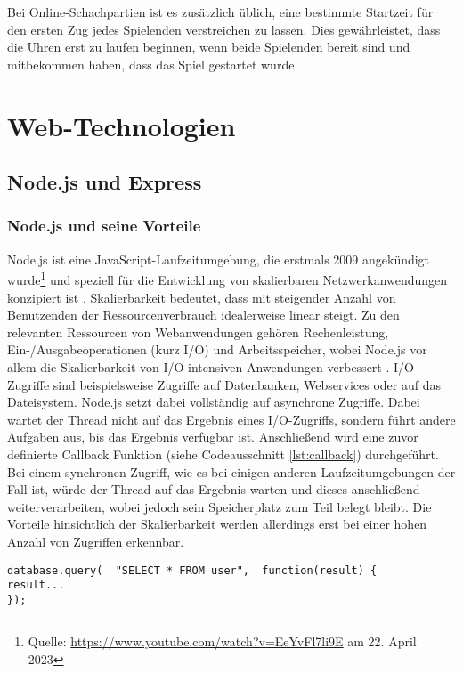 Bei Online-Schachpartien ist es zusätzlich üblich, eine bestimmte Startzeit für den ersten Zug jedes Spielenden verstreichen zu lassen. Dies gewährleistet, dass die Uhren erst zu laufen beginnen, wenn beide Spielenden bereit sind und mitbekommen haben, dass das Spiel gestartet wurde.

    \section{Web-Technologien}
        \subsection{Node.js und Express}
        \subsubsection{Node.js und seine Vorteile}
        \label{sec:node.js}
Node.js ist eine JavaScript-Laufzeitumgebung, die erstmals 2009 angekündigt wurde\footnote{Quelle: \url{https://www.youtube.com/watch?v=EeYvFl7li9E} am 22. April 2023} und speziell für die Entwicklung von skalierbaren Netzwerkanwendungen konzipiert ist \cite[Kapitel~5]{nodejs}. Skalierbarkeit bedeutet, dass mit steigender Anzahl von Benutzenden der Ressourcenverbrauch idealerweise linear steigt. Zu den relevanten Ressourcen von Webanwendungen gehören Rechenleistung, Ein-/Ausgabeoperationen (kurz I/O) und Arbeitsspeicher, wobei Node.js vor allem die Skalierbarkeit von I/O intensiven Anwendungen verbessert \cite{nodejsbook}.
I/O-Zugriffe sind beispielsweise Zugriffe auf Datenbanken, Webservices oder auf das Dateisystem. Node.js setzt dabei vollständig auf asynchrone Zugriffe. Dabei wartet der Thread nicht auf das Ergebnis eines I/O-Zugriffs, sondern führt andere Aufgaben aus, bis das Ergebnis verfügbar ist. Anschließend wird eine zuvor definierte Callback Funktion (siehe Codeausschnitt \ref{lst:callback}) durchgeführt. Bei einem synchronen Zugriff, wie es bei einigen anderen Laufzeitumgebungen der Fall ist, würde der Thread auf das Ergebnis warten und dieses anschließend weiterverarbeiten, wobei jedoch sein Speicherplatz zum Teil belegt bleibt.\cite{nodejsbook} Die Vorteile hinsichtlich der Skalierbarkeit werden allerdings erst bei einer hohen Anzahl von Zugriffen erkennbar.

\begin{lstlisting}[style=codeStyle, caption={Beispiel einer Callback Funktion \textbf{Quelle: } \cite{nodejsbook}}, label={lst:callback}]
database.query(  "SELECT * FROM user",  function(result) {
result...
});
\end{lstlisting}


